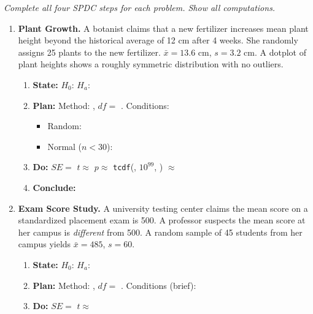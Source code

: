 \documentclass[10pt]{article}
\begin{document}
\namedateperiod

\vspace{0.15in}

\textit{Complete all four SPDC steps for each problem. Show all computations.}

\begin{enumerate}

\item \textbf{Plant Growth.} \quad
A botanist claims that a new fertilizer increases mean plant height beyond the historical
average of 12 cm after 4 weeks. She randomly assigns 25 plants to the new fertilizer.
$\bar x = 13.6$ cm, $s = 3.2$ cm. A dotplot of plant heights shows a roughly symmetric
distribution with no outliers.

\begin{enumerate}[label=\alph*.]
  \item \textbf{State:} $H_0$: \blank{4cm} \quad $H_a$: \blank{4cm}
  \item \textbf{Plan:} Method: \blank{5cm}, $df = $ \blank{1.5cm}. Conditions:
        \begin{itemize}
          \item Random: \writeline
          \item Normal ($n < 30$): \writeline
        \end{itemize}
  \item \textbf{Do:} $SE = $ \blank{3cm} \quad $t \approx$ \blank{2.5cm} \quad
        $p \approx$ \texttt{tcdf}(\blank{2cm}, $10^{99}$, \blank{2cm}) $\approx$ \blank{2cm}
  \item \textbf{Conclude:} 
\end{enumerate}

\vspace{0.08in}

\item \textbf{Exam Score Study.} \quad
A university testing center claims the mean score on a standardized placement exam is 500.
A professor suspects the mean score at her campus is \emph{different} from 500. A random
sample of 45 students from her campus yields $\bar x = 485$, $s = 60$.

\begin{enumerate}[label=\alph*.]
  \item \textbf{State:} $H_0$: \blank{4cm} \quad $H_a$: \blank{4cm}
  \item \textbf{Plan:} Method: \blank{5cm}, $df = $ \blank{1.5cm}. Conditions (brief): \writeline
  \item \textbf{Do:} $SE = $ \blank{3cm} \quad $t \approx$ \blank{2.5cm}


\end{enumerate}
\end{enumerate}
\end{document}
